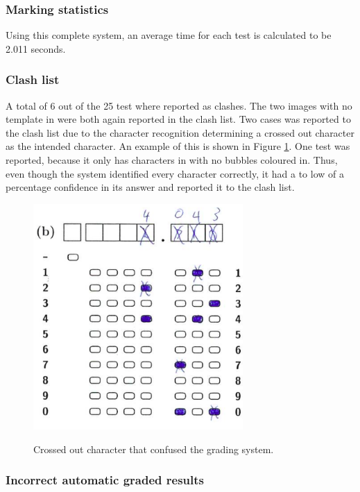 \subsubsection{Marking statistics}

Using this complete system, an average time for each test is calculated to be 2.011 seconds. 

\subsubsection{Clash list}

A total of 6 out of the 25 test where reported as clashes. The two images with no template in were both again reported in the clash list. Two cases was reported to the clash list due to the character recognition determining a crossed out character as the intended character. An example of this is shown in Figure \ref{fig:crossedOutCharacter}. One test was reported, because it only has characters in with no bubbles coloured in. Thus, even though the system identified every character correctly, it had a to low of a percentage confidence in its answer and reported it to the clash list. 

\begin{figure}
  \centering
  \includegraphics[width=8cm]{crossedOutCharacter}\\
  \caption{Crossed out character that confused the grading system.}
  \label{fig:crossedOutCharacter}
\end{figure}

\subsubsection{Incorrect automatic graded results}

